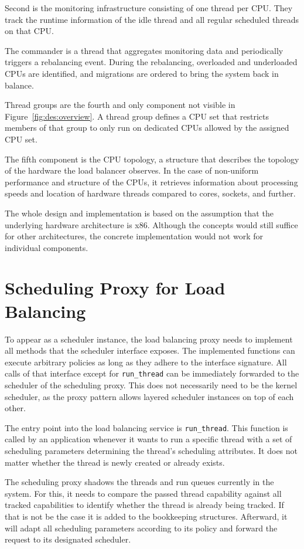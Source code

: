 Second is the monitoring infrastructure consisting of one thread per CPU.
They track the runtime information of the idle thread and all regular scheduled threads on that CPU.

The commander is a thread that aggregates monitoring data and periodically triggers a rebalancing event.
During the rebalancing, overloaded and underloaded CPUs are identified, and migrations are ordered to bring the system back in balance.

Thread groups are the fourth and only component not visible in Figure~\ref{fig:des:overview}.
A thread group defines a CPU set that restricts members of that group to only run on dedicated CPUs allowed by the assigned CPU set.

The fifth component is the CPU topology, a structure that describes the topology of the hardware the load balancer observes.
In the case of non-uniform performance and structure of the CPUs, it retrieves information about processing speeds and location of hardware threads compared to cores, sockets, and further.

The whole design and implementation is based on the assumption that the underlying hardware architecture is x86.
Although the concepts would still suffice for other architectures, the concrete implementation would not work for individual components.

\section{Scheduling Proxy for Load Balancing}
\label{sec:des:proxy}

To appear as a scheduler instance, the load balancing proxy needs to implement all methods that the scheduler interface exposes.
The implemented functions can execute arbitrary policies as long as they adhere to the interface signature.
All calls of that interface except for \texttt{run\_thread} can be immediately forwarded to the scheduler of the scheduling proxy.
This does not necessarily need to be the kernel scheduler, as the proxy pattern allows layered scheduler instances on top of each other.

The entry point into the load balancing service is \texttt{run\_thread}.
This function is called by an application whenever it wants to run a specific thread with a set of scheduling parameters determining the thread's scheduling attributes.
It does not matter whether the thread is newly created or already exists.

The scheduling proxy shadows the threads and run queues currently in the system.
For this, it needs to compare the passed thread capability against all tracked capabilities to identify whether the thread is already being tracked.
If that is not be the case it is added to the bookkeeping structures.
Afterward, it will adapt all scheduling parameters according to its policy and forward the request to its designated scheduler.

